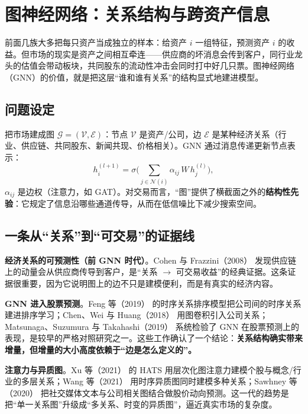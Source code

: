 \section{图神经网络：关系结构与跨资产信息}\label{sec:gnn}

前面几族大多把每只资产当成独立的样本：给资产 $i$ 一组特征，预测资产 $i$ 的收益。但市场的现实是资产之间相互牵连——供应商的坏消息会传到客户，同行业龙头的估值会带动板块，共同股东的流动性冲击会同时打中好几只票。图神经网络（GNN）的价值，就是把这层“谁和谁有关系”的结构显式地建进模型。

\subsection{问题设定}

把市场建成图 $\mathcal{G}=(\mathcal{V},\mathcal{E})$：节点 $\mathcal{V}$ 是资产/公司，边 $\mathcal{E}$ 是某种经济关系（行业、供应链、共同股东、新闻共现、价格相关）。GNN 通过消息传递更新节点表示：
\begin{equation}
  h_i^{(l+1)} = \sigma\Big( \sum_{j\in\mathcal{N}(i)} \alpha_{ij}\, W\, h_j^{(l)} \Big),
\end{equation}
$\alpha_{ij}$ 是边权（注意力，如 GAT\cite{velickovic2018gat}）。对交易而言，“图”提供了横截面之外的\textbf{结构性先验}：它规定了信息沿哪些通道传导，从而在低信噪比下减少搜索空间。

\subsection{一条从“关系”到“可交易”的证据线}

\textbf{经济关系的可预测性（前 GNN 时代）}。Cohen 与 Frazzini（2008）\cite{cohenfrazzini2008} 发现供应链上的动量会从供应商传导到客户，是“关系 $\to$ 可交易收益”的经典证据。这条证据很重要，因为它说明图上的边不只是建模便利，而是有真实的经济内容。

\textbf{GNN 进入股票预测}。Feng 等（2019）\cite{feng2019rsr} 的时序关系排序模型把公司间的时序关系建进排序学习；Chen、Wei 与 Huang（2018）\cite{chen2018gcn} 用图卷积引入公司关系；Matsunaga、Suzumura 与 Takahashi（2019）\cite{matsunaga2019} 系统检验了 GNN 在股票预测上的表现，是较早的严格对照研究之一。这些工作确认了一个结论：\textbf{关系结构确实带来增量，但增量的大小高度依赖于“边是怎么定义的”。}

\textbf{注意力与异质图}。Xu 等（2021）\cite{xu2021hats} 的 HATS 用层次化图注意力建模个股与概念/行业的多层关系；Wang 等（2021）\cite{wang2021thgnn} 用时序异质图同时建模多种关系；Sawhney 等（2020）\cite{sawhney2020} 把社交媒体文本与公司相关图结合做股价动向预测。这一代的趋势是把“单一关系图”升级成“多关系、时变的异质图”，逼近真实市场的复杂度。

